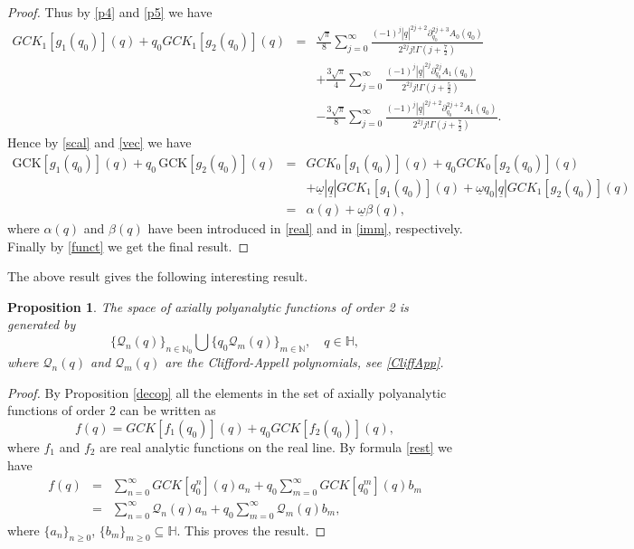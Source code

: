 \documentclass[reqno,11pt]{amsart}
\numberwithin{equation}{section}
\newtheorem{proposition}[theorem]{Proposition}
\theoremstyle{definition}
\begin{document}
\begin{proof}
Thus by \eqref{p4} and \eqref{p5} we have
\begin{eqnarray}
\nonumber
GCK_1[g_1(q_0)](q)+q_0 GCK_1[g_2(q_0)](q)&=&\frac{\sqrt{\pi}}{8} \sum_{j=0}^\infty \frac{(-1)^j | \underline{q}|^{2j+2} \partial_{q_0}^{2j+3}A_0(q_0)}{2^{2j} j! \Gamma \left(j+\frac{7}{2}\right)}\\
\nonumber
&&+ \frac{3 \sqrt{\pi}}{4} \sum_{j=0}^\infty \frac{(-1)^j | \underline{q}|^{2j} \partial_{q_0}^{2j}A_1(q_0)}{2^{2j}j! \Gamma \left(j+\frac{5}{2}\right)}\\
\label{vec}
&&-\frac{3\sqrt{\pi}}{8} \sum_{j=0}^\infty \frac{(-1)^j | \underline{q}|^{2j+2} \partial_{q_0}^{2j+2}A_1(q_0)}{2^{2j}j! \Gamma \left(j+\frac{7}{2}\right)}.
\end{eqnarray}
Hence by \eqref{scal} and \eqref{vec} we have
\begin{eqnarray*}
\mathrm{GCK}[g_1(q_0)](q) + q_0\, \mathrm{GCK}[g_2(q_0)](q)&=&GCK_0[g_1(q_0)](q)+q_0GCK_0[g_2(q_0)](q)\\
&&+ \underline{\omega} | \underline{q}| GCK_1[g_1(q_0)](q)+ \underline{\omega}q_0|\underline{q}| GCK_1[g_2(q_0)](q)\\
&=& \alpha(q)+ \underline{\omega} \beta(q),
\end{eqnarray*}
where $\alpha(q)$ and $\beta(q)$ have been introduced in \eqref{real} and in \eqref{imm}, respectively. Finally by \eqref{funct} we get the final result.


\end{proof}


The above result gives the following interesting result.



\begin{proposition}
The space of axially polyanalytic functions of order 2 is generated by
$$ \{\mathcal{Q}_{n}(q)\}_{n \in \mathbb{N}_0} \bigcup   \{q_0 \mathcal{Q}_m(q)\}_{m \in \mathbb{N}}, \quad q \in \mathbb{H},$$
where $\mathcal{Q}_{n}(q)$ and $ \mathcal{Q}_{m}(q)$ are the Clifford-Appell polynomials, see \eqref{CliffApp}.
\end{proposition}
\begin{proof}
By Proposition \ref{decop}  all the elements in the set of axially polyanalytic functions of order $2$ can be written as
$$ f(q)= GCK[f_1(q_0)](q)+q_0 GCK[f_2(q_0)](q),$$
where $f_1$ and $f_2$ are real analytic functions on the real line. By formula \eqref{rest} we have
\begin{eqnarray*}
f(q)&=& \sum_{n=0}^{\infty} GCK[q_0^n](q)a_n+q_0 \sum_{m=0}^{\infty} GCK[q_0^m](q) b_m\\
&=& \sum_{n=0}^{\infty} \mathcal{Q}_n(q)a_n+q_0 \sum_{m=0}^{\infty} \mathcal{Q}_m(q)b_m,
\end{eqnarray*}
where $ \{a_n\}_{n \geq 0}$, $ \{b_m\}_{m \geq 0} \subseteq \mathbb{H}$. This proves the result.
\end{proof}
\end{document}
